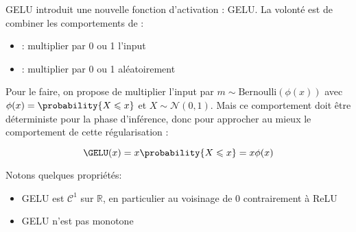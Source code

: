 \documentclass{beamer}
\begin{document}
\begin{frame}{}{GELU}
	\cite{hendrycks2016gaussian} introduit une nouvelle fonction d'activation : GELU. La volonté est de combiner les comportements de :
	\begin{itemize}
		\item {} : multiplier par 0 ou 1 l'input
		\item {} : multiplier par 0 ou 1 aléatoirement
	\end{itemize}
	Pour le faire, on propose de multiplier l'input par $m \sim \text{Bernoulli}(\phi(x))$ avec $\phi(x) = \probability{X \leqslant x}$ et $X\sim \mathcal{N}(0, 1)$. Mais ce comportement doit être déterministe pour la phase d'inférence, donc pour approcher au mieux le comportement de cette régularisation : 
	
	\begin{equation*}
		\GELU(x) = x\probability{X \leqslant x} = x\phi(x)
	\end{equation*}

	Notons quelques propriétés:
	\begin{itemize}
		\item GELU est $\mathcal{C}^1$ sur $\mathbb{R}$, en particulier au voisinage de 0 contrairement à ReLU
		\item GELU n'est pas monotone
	\end{itemize}
\end{frame}
\end{document}
